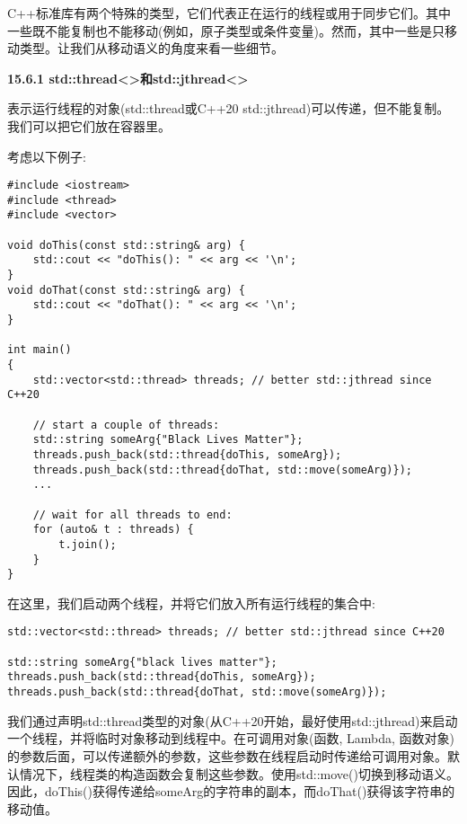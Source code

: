 C++标准库有两个特殊的类型，它们代表正在运行的线程或用于同步它们。其中一些既不能复制也不能移动(例如，原子类型或条件变量)。然而，其中一些是只移动类型。让我们从移动语义的角度来看一些细节。\par

\hspace*{\fill} \par %
\textbf{15.6.1 std::thread<>和std::jthread<>}

表示运行线程的对象(std::thread或C++20 std::jthread)可以传递，但不能复制。我们可以把它们放在容器里。\par

考虑以下例子:\par

{\color{red}{lib/thread.cpp}}\par

\begin{lstlisting}[caption={}]
#include <iostream>
#include <thread>
#include <vector>

void doThis(const std::string& arg) {
	std::cout << "doThis(): " << arg << '\n';
}
void doThat(const std::string& arg) {
	std::cout << "doThat(): " << arg << '\n';
}

int main()
{
	std::vector<std::thread> threads; // better std::jthread since C++20
	
	// start a couple of threads:
	std::string someArg{"Black Lives Matter"};
	threads.push_back(std::thread{doThis, someArg});
	threads.push_back(std::thread{doThat, std::move(someArg)});
	...
	
	// wait for all threads to end:
	for (auto& t : threads) {
		t.join();
	}
}
\end{lstlisting}

在这里，我们启动两个线程，并将它们放入所有运行线程的集合中:\par

\begin{lstlisting}[caption={}]
std::vector<std::thread> threads; // better std::jthread since C++20

std::string someArg{"black lives matter"};
threads.push_back(std::thread{doThis, someArg});
threads.push_back(std::thread{doThat, std::move(someArg)});
\end{lstlisting}

我们通过声明std::thread类型的对象(从C++20开始，最好使用std::jthread)来启动一个线程，并将临时对象移动到线程中。在可调用对象(函数, Lambda, 函数对象)的参数后面，可以传递额外的参数，这些参数在线程启动时传递给可调用对象。默认情况下，线程类的构造函数会复制这些参数。使用std::move()切换到移动语义。因此，doThis()获得传递给someArg的字符串的副本，而doThat()获得该字符串的移动值。\par

